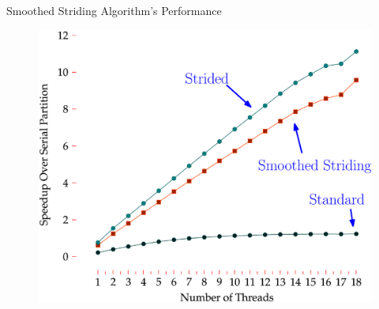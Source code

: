 \documentclass[table,serif,mathserif,final]{beamer}
\theoremstyle{remark}
\begin{document}
\begin{frame}{}
\begin{columns}[t]
\begin{column}{0.2\linewidth}
\vspace{0.5cm}
\begin{block}{\Huge Smoothed Striding Algorithm's Performance}
	\begin{figure}
		\begin{center}
			\includegraphics[width=0.9\linewidth]{imgs/compiledGraph.eps}
		\end{center}
	\end{figure}
\end{block}


\end{column}
\end{columns}
\end{frame}
\end{document}
